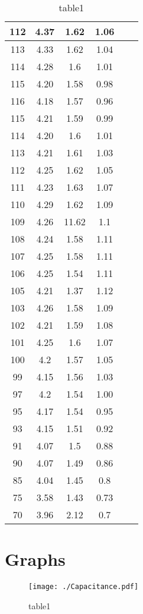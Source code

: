 \documentclass{ieeeconf}
\begin{document}
\begin{table}[H]
{\begin{tabular}{|c|c|c|c|c|c|}
112 & 4.37 & 1.62 & 1.06 &  &  \\ \hline
113 & 4.33 & 1.62 & 1.04 &  &  \\ \hline
114 & 4.28 & 1.6 & 1.01 &  &  \\ \hline
115 & 4.20 & 1.58 & 0.98 &  &  \\ \hline
116 & 4.18 & 1.57 & 0.96 &  &  \\ \hline
115 & 4.21 & 1.59 & 0.99 &  &  \\ \hline
114 & 4.20 & 1.6 & 1.01 &  &  \\ \hline
113 & 4.21 & 1.61 & 1.03 &  &  \\ \hline
112 & 4.25 & 1.62 & 1.05 &  &  \\ \hline
111 & 4.23 & 1.63 & 1.07 &  &  \\ \hline
110 & 4.29 & 1.62 & 1.09 &  &  \\ \hline
109 & 4.26 & 11.62 & 1.1 &  &  \\ \hline
108 & 4.24 & 1.58 & 1.11 &  &  \\ \hline
107 & 4.25 & 1.58 & 1.11 &  &  \\ \hline
106 & 4.25 & 1.54 & 1.11 &  &  \\ \hline
105 & 4.21 & 1.37 & 1.12 &  &  \\ \hline
103 & 4.26 & 1.58 & 1.09 &  &  \\ \hline
102 & 4.21 & 1.59 & 1.08 &  &  \\ \hline
101 & 4.25 & 1.6 & 1.07 &  &  \\ \hline
100 & 4.2 & 1.57 & 1.05 &  &  \\ \hline
99 & 4.15 & 1.56 & 1.03 &  &  \\ \hline
97 & 4.2 & 1.54 & 1.00 &  &  \\ \hline
95 & 4.17 & 1.54 & 0.95 &  &  \\ \hline
93 & 4.15 & 1.51 & 0.92 &  &  \\ \hline
91 & 4.07 & 1.5 & 0.88 &  &  \\ \hline
90 & 4.07 & 1.49 & 0.86 &  &  \\ \hline
85 & 4.04 & 1.45 & 0.8 &  &  \\ \hline
75 & 3.58 & 1.43 & 0.73 &  &  \\ \hline
70 & 3.96 & 2.12 & 0.7 &  &  \\ \hline

\end{tabular}%
}
\caption{table1}
\label{tbl:"table1"}
\end{table}
\section{Graphs}
\begin{figure}[H]
\centering
\texttt{[image: ./Capacitance.pdf]}
\caption{table1}
\label{fig:"table1"}
\end{figure}
\end{document}
